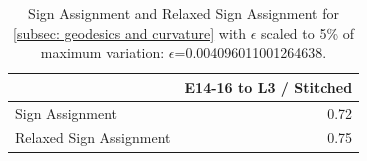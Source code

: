 \begin{table}
\caption{Sign Assignment and Relaxed Sign Assignment for \cref{subsec: geodesics and curvature} with $\epsilon$ scaled to 5\% of maximum variation: $\epsilon$=0.004096011001264638.}
\label{tab: Sign Assigments 5 percent}
\begin{tabular}{lr}
\toprule
 & E14-16 to L3 / Stitched \\
\midrule
Sign Assignment & 0.72 \\
Relaxed Sign Assignment & 0.75 \\
\bottomrule
\end{tabular}
\end{table}
